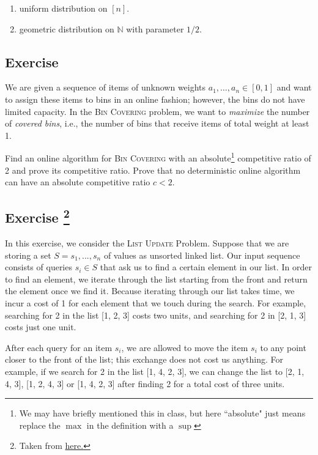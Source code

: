 \documentclass[14pt]{extreport}
\newcounter{counter}
\newcommand{\Exercise}{Exercise \stepcounter{counter}\thecounter}
\begin{document}
    \begin{enumerate}[label=(\alph*)]
        \item uniform distribution on $[n]$.
        \item geometric distribution on $\mathbb{N}$ with parameter $1/2$.
    \end{enumerate}

\subsection*{\Exercise}
    We are given a sequence of items of unknown weights $a_1, \ldots, a_n \in [0, 1]$ and want to assign these items to bins in an online fashion; however, the bins do not have limited capacity. In the \textsc{Bin Covering} problem, we want to \textit{maximize} the number of \textit{covered bins}, i.e., the number of bins that receive items of total weight at least 1. 
    
    \vspace{5mm} Find an online algorithm for \textsc{Bin Covering} with an absolute\footnote{We may have briefly mentioned this in class, but here ``absolute" just means replace the $\max$ in the definition with a $\sup$} competitive ratio of 2 and prove its competitive ratio. Prove that no deterministic online algorithm can have an absolute competitive ratio $ c < 2 $.

\subsection*{\Exercise\footnote{Taken from \href{https://www.ibr.cs.tu-bs.de/courses/ss18/oa/exercise_sheets/ex2.pdf}{here.}}}
    In this exercise, we consider the \textsc{List Update} Problem. Suppose that we are storing a set $S = {s_1, . . . , s_{n}}$ of values as unsorted linked list. Our input sequence consists of queries $s_{i} \in S$ that ask us to find a certain element in our list. In order to find an element, we iterate through the list starting from the front and return the element once we find it. Because iterating through our list takes time, we incur a cost of 1 for each element that we touch during the search. For example, searching for 2 in the list [1, 2, 3] costs two units, and searching for 2 in [2, 1, 3]
    costs just one unit.
    
    \vspace{5mm}
    After each query for an item $s_{i}$, we are allowed to move the item $s_{i}$ to any point closer to
    the front of the list; this exchange does not cost us anything. For example, if we search
    for 2 in the list [1, 4, 2, 3], we can change the list to [2, 1, 4, 3], [1, 2, 4, 3] or [1, 4, 2, 3] after finding 2 for a total cost of three units.
    
\end{document}
